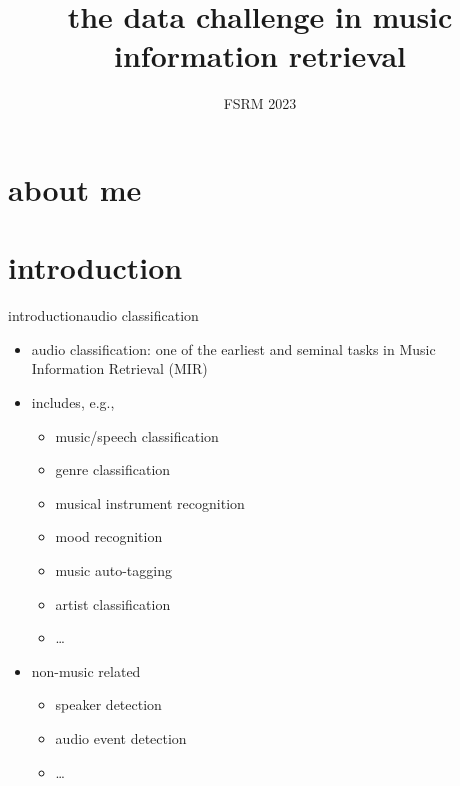 
\usepackage{multirow}

\title{the data challenge in music information retrieval}
\subtitle{FSRM 2023} 


	

    \section[about]{about me}
        
        
    \section[intro]{introduction}
        \begin{frame}{introduction}{audio classification}
            \begin{itemize}
                \item   audio classification: one of the earliest and seminal tasks in Music Information Retrieval (MIR)
                \bigskip
                \item   includes, e.g.,
                    \begin{itemize}
                        \item   music/speech classification
                        \item   genre classification
                        \item   musical instrument recognition
                        \item   mood recognition
                        \item   music auto-tagging
                        \item   artist classification
                        \item   \ldots
                    \end{itemize}
                \bigskip
                 \item<2->  non-music related
                    \begin{itemize}
                        \item   speaker detection
                        \item   audio event detection
                        \item   \ldots
                    \end{itemize}
            \end{itemize}
        \end{frame}
        
